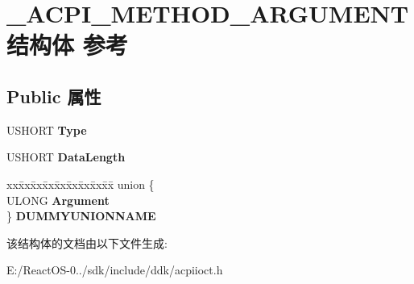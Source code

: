 \hypertarget{struct___a_c_p_i___m_e_t_h_o_d___a_r_g_u_m_e_n_t}{}\section{\+\_\+\+A\+C\+P\+I\+\_\+\+M\+E\+T\+H\+O\+D\+\_\+\+A\+R\+G\+U\+M\+E\+N\+T结构体 参考}
\label{struct___a_c_p_i___m_e_t_h_o_d___a_r_g_u_m_e_n_t}
\subsection*{Public 属性}
\begin{DoxyCompactItemize}
\item 
\mbox{\label{struct___a_c_p_i___m_e_t_h_o_d___a_r_g_u_m_e_n_t_a3b827994ca1fedbfacb3fc9f04a81af6}} 
U\+S\+H\+O\+RT {\bfseries Type}
\item 
\mbox{\label{struct___a_c_p_i___m_e_t_h_o_d___a_r_g_u_m_e_n_t_adcf75998f3c31241b44cbc9ee8b15a53}} 
U\+S\+H\+O\+RT {\bfseries Data\+Length}
\item 
\mbox{\label{struct___a_c_p_i___m_e_t_h_o_d___a_r_g_u_m_e_n_t_a0ca42ebcbbb75fc1ece168b7a89e02fc}} 
\begin{tabbing}
xx\=xx\=xx\=xx\=xx\=xx\=xx\=xx\=xx\=\kill
union \{\\
\>ULONG {\bfseries Argument}\\
\} {\bfseries DUMMYUNIONNAME}\\

\end{tabbing}\end{DoxyCompactItemize}


该结构体的文档由以下文件生成\+:\begin{DoxyCompactItemize}
\item 
E\+:/\+React\+O\+S-\/0../sdk/include/ddk/acpiioct.\+h\end{DoxyCompactItemize}
